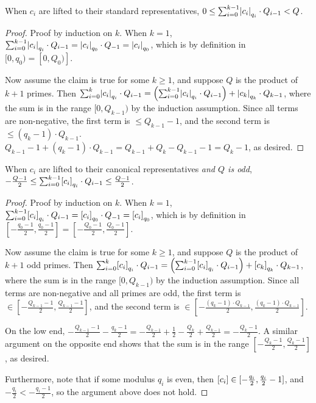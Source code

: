 \documentclass[../../fheimpl.tex]{subfiles}
\begin{document}
\begin{lemma}
	When $c_i$ are lifted to their standard representatives, 
	$0\le \sum_{i=0}^{k-1} \abs*{c_i}_{q_i}\cdot Q_{i-1} < Q$.
\end{lemma}
\begin{proof}
	Proof by induction on $k$. When $k=1$, $\sum_{i=0}^{k-1} \abs*{c_i}_{q_i}\cdot Q_{i-1} = \abs*{c_i}_{q_0}\cdot Q_{-1} = \abs*{c_i}_{q_0}$, which is by definition in $[0, q_0) = [0, Q_0)]$. 
	
	Now assume the claim is true for some $k \ge 1$, and suppose $Q$ is the product of $k+1$ primes. Then $\sum_{i=0}^{k} \abs*{c_i}_{q_i}\cdot Q_{i-1} = \parens*{\sum_{i=0}^{k-1} \abs*{c_i}_{q_i}\cdot Q_{i-1}} + \abs*{c_k}_{q_k}\cdot Q_{k-1}$, where the sum is in the range $[0, Q_{k-1})$ by the induction assumption. Since all terms are non-negative, the first term is $\le Q_{k-1}-1$, and the second term is $\le (q_k-1)\cdot Q_{k-1}$. $Q_{k-1}-1 + (q_k-1)\cdot Q_{k-1} = Q_{k-1} + Q_{k} - Q_{k-1} - 1 = Q_k-1$, as desired.
\end{proof}

\begin{lemma}
	When $c_i$ are lifted to their canonical representatives \emph{and $Q$ is odd}, 
	$-\frac{Q-1}{2}\le \sum_{i=0}^{k-1} \bracks*{c_i}_{q_i}\cdot Q_{i-1} \le \frac{Q-1}{2}$.
\end{lemma}
\begin{proof}
	Proof by induction on $k$. When $k=1$, $\sum_{i=0}^{k-1} \bracks*{c_i}_{q_i}\cdot Q_{i-1} = \bracks*{c_i}_{q_0}\cdot Q_{-1} = \bracks*{c_i}_{q_0}$, which is by definition in $[-\frac{q_0-1}{2}, \frac{q_0-1}{2}] = [-\frac{Q_0-1}{2}, \frac{Q_0-1}{2}]$. 
	
	Now assume the claim is true for some $k \ge 1$, and suppose $Q$ is the product of $k+1$ odd primes. Then $\sum_{i=0}^{k} \bracks*{c_i}_{q_i}\cdot Q_{i-1} = \parens*{\sum_{i=0}^{k-1} \bracks*{c_i}_{q_i}\cdot Q_{i-1}} + \bracks*{c_k}_{q_k}\cdot Q_{k-1}$, where the sum is in the range $[0, Q_{k-1})$ by the induction assumption. Since all terms are non-negative and all primes are odd, the first term is $\in [-\frac{Q_{k-1}-1}{2}, \frac{Q_{k-1}-1}{2}]$, and the second term is $\in [-\frac{(q_k-1)\cdot Q_{k-1}}{2}, \frac{(q_k-1)\cdot Q_{k-1}}{2}]$.
	
	On the low end, $-\frac{Q_{k-1}-1}{2}-\frac{q_k-1}{2} = -\frac{Q_{k-1}}{2}+\frac{1}{2}-\frac{Q_k}{2} + \frac{Q_{k-1}}{2} = -\frac{Q_k-1}{2}$.
	A similar argument on the opposite end shows that the sum is in the range $[-\frac{Q_k-1}{2}, \frac{Q_k-1}{2}]$, as desired.
	
	Furthermore, note that if some modulus $q_i$ is even, then $\bracks*{c_i}\in[-\frac{q_i}{2}, \frac{q_i}{2}-1]$, and $-\frac{q_i}{2} < -\frac{q_i-1}{2}$, so the argument above does not hold.
\end{proof}
\end{document}
